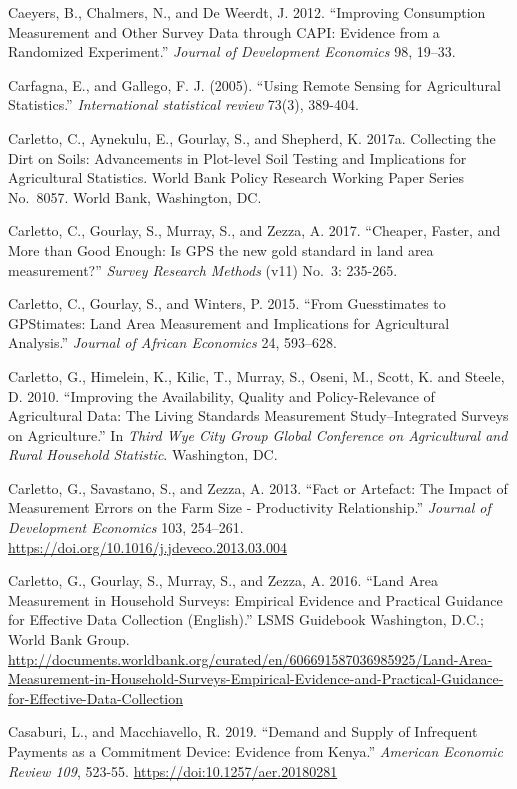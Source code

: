 \documentclass[
]{book}
\begin{document}
Caeyers, B., Chalmers, N., and De Weerdt, J. 2012. ``Improving Consumption Measurement and Other Survey Data through CAPI: Evidence from a Randomized Experiment.'' \emph{Journal of Development Economics} 98, 19--33.

Carfagna, E., and Gallego, F. J. (2005). ``Using Remote Sensing for Agricultural Statistics.'' \emph{International statistical review} 73(3), 389-404.

Carletto, C., Aynekulu, E., Gourlay, S., and Shepherd, K. 2017a. Collecting the Dirt on Soils: Advancements in Plot-level Soil Testing and Implications for Agricultural Statistics. World Bank Policy Research Working Paper Series No.~8057. World Bank, Washington, DC.

Carletto, C., Gourlay, S., Murray, S., and Zezza, A. 2017. ``Cheaper, Faster, and More than Good Enough: Is GPS the new gold standard in land area measurement?'' \emph{Survey Research Methods} (v11) No.~3: 235-265.

Carletto, C., Gourlay, S., and Winters, P. 2015. ``From Guesstimates to GPStimates: Land Area Measurement and Implications for Agricultural Analysis.'' \emph{Journal of African Economics} 24, 593--628.

Carletto, G., Himelein, K., Kilic, T., Murray, S., Oseni, M., Scott, K. and Steele, D. 2010. ``Improving the Availability, Quality and Policy-Relevance of Agricultural Data: The Living Standards Measurement Study--Integrated Surveys on Agriculture.'' In \emph{Third Wye City Group Global Conference on Agricultural and Rural Household Statistic}. Washington, DC.

Carletto, G., Savastano, S., and Zezza, A. 2013. ``Fact or Artefact: The Impact of Measurement Errors on the Farm Size - Productivity Relationship.'' \emph{Journal of Development Economics} 103, 254--261. \url{https://doi.org/10.1016/j.jdeveco.2013.03.004}

Carletto, G., Gourlay, S., Murray, S., and Zezza, A. 2016. ``Land Area Measurement in Household Surveys: Empirical Evidence and Practical Guidance for Effective Data Collection (English).'' LSMS Guidebook Washington, D.C.; World Bank Group. \url{http://documents.worldbank.org/curated/en/606691587036985925/Land-Area-Measurement-in-Household-Surveys-Empirical-Evidence-and-Practical-Guidance-for-Effective-Data-Collection}

Casaburi, L., and Macchiavello, R. 2019. ``Demand and Supply of Infrequent Payments as a Commitment Device: Evidence from Kenya.'' \emph{American Economic Review 109}, 523-55. \url{https://doi:10.1257/aer.20180281}
\end{document}
